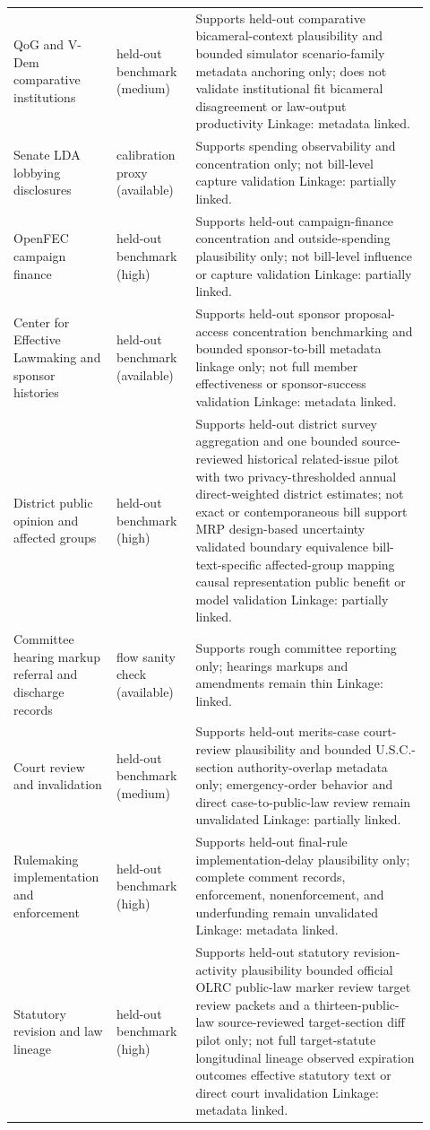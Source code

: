 \begin{longtable}{>{\raggedright\arraybackslash}p{0.21\linewidth}>{\raggedright\arraybackslash}p{0.18\linewidth}>{\raggedright\arraybackslash}p{0.53\linewidth}}
QoG and V-Dem comparative institutions & held-out benchmark (medium) & Supports held-out comparative bicameral-context plausibility and bounded simulator scenario-family metadata anchoring only; does not validate institutional fit bicameral disagreement or law-output productivity Linkage: metadata linked. \\
Senate LDA lobbying disclosures & calibration proxy (available) & Supports spending observability and concentration only; not bill-level capture validation Linkage: partially linked. \\
OpenFEC campaign finance & held-out benchmark (high) & Supports held-out campaign-finance concentration and outside-spending plausibility only; not bill-level influence or capture validation Linkage: partially linked. \\
Center for Effective Lawmaking and sponsor histories & held-out benchmark (available) & Supports held-out sponsor proposal-access concentration benchmarking and bounded sponsor-to-bill metadata linkage only; not full member effectiveness or sponsor-success validation Linkage: metadata linked. \\
District public opinion and affected groups & held-out benchmark (high) & Supports held-out district survey aggregation and one bounded source-reviewed historical related-issue pilot with two privacy-thresholded annual direct-weighted district estimates; not exact or contemporaneous bill support MRP design-based uncertainty validated boundary equivalence bill-text-specific affected-group mapping causal representation public benefit or model validation Linkage: partially linked. \\
Committee hearing markup referral and discharge records & flow sanity check (available) & Supports rough committee reporting only; hearings markups and amendments remain thin Linkage: linked. \\
Court review and invalidation & held-out benchmark (medium) & Supports held-out merits-case court-review plausibility and bounded U.S.C.-section authority-overlap metadata only; emergency-order behavior and direct case-to-public-law review remain unvalidated Linkage: partially linked. \\
Rulemaking implementation and enforcement & held-out benchmark (high) & Supports held-out final-rule implementation-delay plausibility only; complete comment records, enforcement, nonenforcement, and underfunding remain unvalidated Linkage: metadata linked. \\
Statutory revision and law lineage & held-out benchmark (high) & Supports held-out statutory revision-activity plausibility bounded official OLRC public-law marker review target review packets and a thirteen-public-law source-reviewed target-section diff pilot only; not full target-statute longitudinal lineage observed expiration outcomes effective statutory text or direct court invalidation Linkage: metadata linked. \\
\end{longtable}
\endgroup
\clearpage

